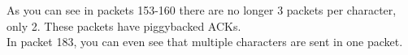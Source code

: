 As you can see in packets 153-160 there are no longer 3 packets per character, only 2. These packets have piggybacked ACKs. \\
In packet 183, you can even see that multiple characters are sent in one packet.
